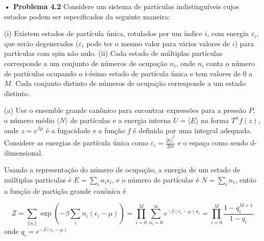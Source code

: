 \documentclass[12pt]{article}
\begin{document}
\textbf{• Problema 4.2} Considere um sistema de partículas indistinguíveis cujos estados podem ser especificados da seguinte maneira:

(i) Existem estados de partícula única, rotulados por um índice $i$, com energia $\varepsilon_i$, que serão degenerados ($\varepsilon_i$ pode ter o mesmo valor para vários valores de $i$) para partículas com spin não nulo.
(ii) Cada estado de múltiplas partículas corresponde a um conjunto de números de ocupação $ {n_i}$, onde $ {n_i}$ conta o número de partículas ocupando o i-ésimo estado de partícula única e tem valores de 0 a $M$. Cada conjunto distinto de números de ocupação corresponde a um estado distinto.

(a) Use o ensemble grande canônico para encontrar expressões para a pressão $P$, o número médio $\langle N \rangle$ de partículas e a energia interna $U = \langle E \rangle$ na forma $T^\alpha f(z)$, onde $z = e^{\beta \mu}$ é a fugacidade e a função $f$ é definida por uma integral adequada. Considere as energias de partícula única como $\varepsilon_i = \frac{|p_i|^2}{2m}$ e o espaço como sendo d-dimensional.

 Usando a representação do número de ocupação, a energia de um estado de múltiplas partículas é $E = \sum_i n_i \epsilon_i$, e o número de partículas é $ N = \sum_i n_i$, então a função de partição grande canônica é 

\[
Z = \sum_{\{n_i\}} \exp \left( -\beta \sum_i n_i (\epsilon_i - \mu) \right) 
= \prod_{i=0}^M \sum_{n_i=0}^\infty e^{-\beta (\epsilon_i - \mu)n_i}
= \prod_{i=0}^M \frac{1 - q_i^{M+1}}{1 - q_i}
\]
onde $q_i = e^{-\beta (\epsilon_i - \mu)}$
\end{document}
